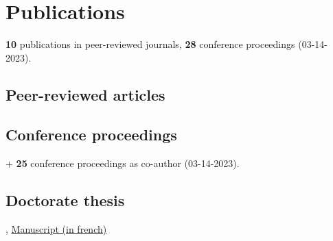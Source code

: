 \section{Publications}
\textbf{10} publications in peer-reviewed journals, \textbf{28} conference proceedings (03-14-2023).

\subsection{Peer-reviewed articles}

\tabitem {}

\tabitem {}

\tabitem {}

\tabitem {}

\tabitem {}

\tabitem {}

\tabitem {}

\tabitem {}

\tabitem {}

\tabitem {}

\subsection{Conference proceedings}
\tabitem {}

\tabitem {}

\tabitem {}

$+$ \textbf{25} conference proceedings as co-author (03-14-2023).

\subsection{Doctorate thesis}
, \href{https://raw.githubusercontent.com/fkeruzore/PhDThesis-public/main/manuscrit.pdf}{Manuscript (in french)}
